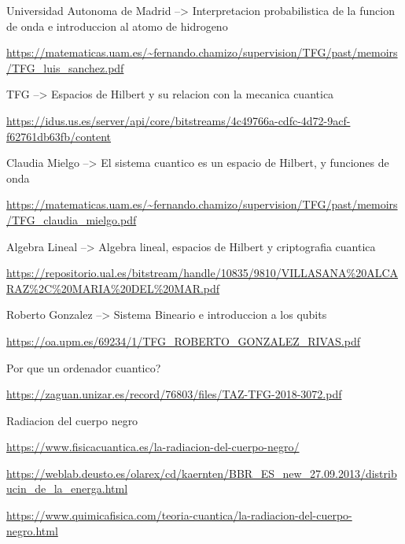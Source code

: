 \documentclass{article}
\begin{document}
        Universidad Autonoma de Madrid --> Interpretacion probabilistica de la funcion de onda e introduccion al atomo de hidrogeno\par
        \url{https://matematicas.uam.es/~fernando.chamizo/supervision/TFG/past/memoirs/TFG\_luis\_sanchez.pdf}
        \vspace{2mm}

        TFG --> Espacios de Hilbert y su relacion con la mecanica cuantica\par
        \url{https://idus.us.es/server/api/core/bitstreams/4c49766a-cdfc-4d72-9acf-f62761db63fb/content}
        \vspace{2mm}

        Claudia Mielgo --> El sistema cuantico es un espacio de Hilbert, y funciones de onda\par
        \url{https://matematicas.uam.es/~fernando.chamizo/supervision/TFG/past/memoirs/TFG\_claudia\_mielgo.pdf}
        \vspace{2mm}

        Algebra Lineal --> Algebra lineal, espacios de Hilbert y criptografia cuantica\par
        \url{https://repositorio.ual.es/bitstream/handle/10835/9810/VILLASANA%20ALCARAZ%2C%20MARIA%20DEL%20MAR.pdf}
        \vspace{2mm}

        Roberto Gonzalez --> Sistema Bineario e introduccion a los qubits\par
        \url{https://oa.upm.es/69234/1/TFG\_ROBERTO\_GONZALEZ\_RIVAS.pdf}
        \vspace{2mm}

        Por que un ordenador cuantico?\par
        \url{https://zaguan.unizar.es/record/76803/files/TAZ-TFG-2018-3072.pdf}
        \vspace{2mm}

        Radiacion del cuerpo negro\par
        \url{https://www.fisicacuantica.es/la-radiacion-del-cuerpo-negro/}
        \vspace{2mm}

        \url{https://weblab.deusto.es/olarex/cd/kaernten/BBR_ES_new_27.09.2013/distribucin_de_la_energa.html}
        \vspace{2mm}

        \url{https://www.quimicafisica.com/teoria-cuantica/la-radiacion-del-cuerpo-negro.html}
        \vspace{2mm}
\end{document}
